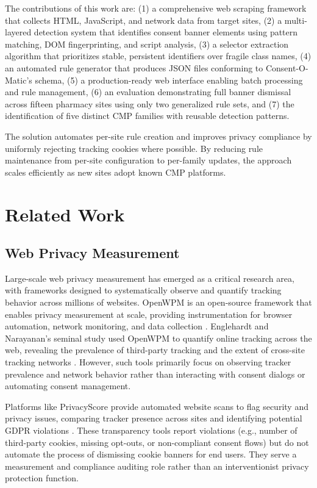 \documentclass[conference]{IEEEtran}
\begin{document}
The contributions of this work are: (1) a comprehensive web scraping framework that collects HTML, JavaScript, and network data from target sites, (2) a multi-layered detection system that identifies consent banner elements using pattern matching, DOM fingerprinting, and script analysis, (3) a selector extraction algorithm that prioritizes stable, persistent identifiers over fragile class names, (4) an automated rule generator that produces JSON files conforming to Consent-O-Matic's schema, (5) a production-ready web interface enabling batch processing and rule management, (6) an evaluation demonstrating full banner dismissal across fifteen pharmacy sites using only two generalized rule sets, and (7) the identification of five distinct CMP families with reusable detection patterns.

The solution automates per-site rule creation and improves privacy compliance by uniformly rejecting tracking cookies where possible. By reducing rule maintenance from per-site configuration to per-family updates, the approach scales efficiently as new sites adopt known CMP platforms.

\section{Related Work}

\subsection{Web Privacy Measurement}

Large-scale web privacy measurement has emerged as a critical research area, with frameworks designed to systematically observe and quantify tracking behavior across millions of websites. OpenWPM is an open-source framework that enables privacy measurement at scale, providing instrumentation for browser automation, network monitoring, and data collection \cite{openwpm}. Englehardt and Narayanan's seminal study used OpenWPM to quantify online tracking across the web, revealing the prevalence of third-party tracking and the extent of cross-site tracking networks \cite{englehardt2016}. However, such tools primarily focus on observing tracker prevalence and network behavior rather than interacting with consent dialogs or automating consent management.

Platforms like PrivacyScore provide automated website scans to flag security and privacy issues, comparing tracker presence across sites and identifying potential GDPR violations \cite{bollinger2022}. These transparency tools report violations (e.g., number of third-party cookies, missing opt-outs, or non-compliant consent flows) but do not automate the process of dismissing cookie banners for end users. They serve a measurement and compliance auditing role rather than an interventionist privacy protection function.
\end{document}
